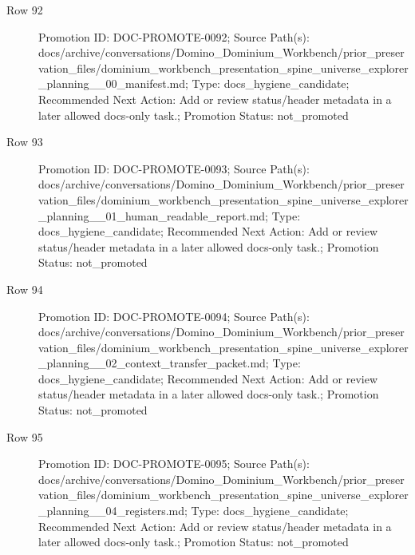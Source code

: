 \documentclass[9pt,a4paper,openany]{book}
\begin{document}
\begin{description}
\item[Row 92] Promotion ID: DOC-\allowbreak{}PROMOTE-\allowbreak{}0092; Source Path(s): docs/\allowbreak{}archive/\allowbreak{}conversations/\allowbreak{}Domino\_\allowbreak{}Dominium\_\allowbreak{}Workbench/\allowbreak{}prior\_\allowbreak{}preservation\_\allowbreak{}files/\allowbreak{}dominium\_\allowbreak{}workbench\_\allowbreak{}presentation\_\allowbreak{}spine\_\allowbreak{}universe\_\allowbreak{}explorer\_\allowbreak{}planning\_\allowbreak{}\_\allowbreak{}00\_\allowbreak{}manifest.\allowbreak{}md; Type: docs\_\allowbreak{}hygiene\_\allowbreak{}candidate; Recommended Next Action: Add or review status/\allowbreak{}header metadata in a later allowed docs-\allowbreak{}only task.\allowbreak{}; Promotion Status: not\_\allowbreak{}promoted
\item[Row 93] Promotion ID: DOC-\allowbreak{}PROMOTE-\allowbreak{}0093; Source Path(s): docs/\allowbreak{}archive/\allowbreak{}conversations/\allowbreak{}Domino\_\allowbreak{}Dominium\_\allowbreak{}Workbench/\allowbreak{}prior\_\allowbreak{}preservation\_\allowbreak{}files/\allowbreak{}dominium\_\allowbreak{}workbench\_\allowbreak{}presentation\_\allowbreak{}spine\_\allowbreak{}universe\_\allowbreak{}explorer\_\allowbreak{}planning\_\allowbreak{}\_\allowbreak{}01\_\allowbreak{}human\_\allowbreak{}readable\_\allowbreak{}report.\allowbreak{}md; Type: docs\_\allowbreak{}hygiene\_\allowbreak{}candidate; Recommended Next Action: Add or review status/\allowbreak{}header metadata in a later allowed docs-\allowbreak{}only task.\allowbreak{}; Promotion Status: not\_\allowbreak{}promoted
\item[Row 94] Promotion ID: DOC-\allowbreak{}PROMOTE-\allowbreak{}0094; Source Path(s): docs/\allowbreak{}archive/\allowbreak{}conversations/\allowbreak{}Domino\_\allowbreak{}Dominium\_\allowbreak{}Workbench/\allowbreak{}prior\_\allowbreak{}preservation\_\allowbreak{}files/\allowbreak{}dominium\_\allowbreak{}workbench\_\allowbreak{}presentation\_\allowbreak{}spine\_\allowbreak{}universe\_\allowbreak{}explorer\_\allowbreak{}planning\_\allowbreak{}\_\allowbreak{}02\_\allowbreak{}context\_\allowbreak{}transfer\_\allowbreak{}packet.\allowbreak{}md; Type: docs\_\allowbreak{}hygiene\_\allowbreak{}candidate; Recommended Next Action: Add or review status/\allowbreak{}header metadata in a later allowed docs-\allowbreak{}only task.\allowbreak{}; Promotion Status: not\_\allowbreak{}promoted
\item[Row 95] Promotion ID: DOC-\allowbreak{}PROMOTE-\allowbreak{}0095; Source Path(s): docs/\allowbreak{}archive/\allowbreak{}conversations/\allowbreak{}Domino\_\allowbreak{}Dominium\_\allowbreak{}Workbench/\allowbreak{}prior\_\allowbreak{}preservation\_\allowbreak{}files/\allowbreak{}dominium\_\allowbreak{}workbench\_\allowbreak{}presentation\_\allowbreak{}spine\_\allowbreak{}universe\_\allowbreak{}explorer\_\allowbreak{}planning\_\allowbreak{}\_\allowbreak{}04\_\allowbreak{}registers.\allowbreak{}md; Type: docs\_\allowbreak{}hygiene\_\allowbreak{}candidate; Recommended Next Action: Add or review status/\allowbreak{}header metadata in a later allowed docs-\allowbreak{}only task.\allowbreak{}; Promotion Status: not\_\allowbreak{}promoted

\end{description}
\end{document}
